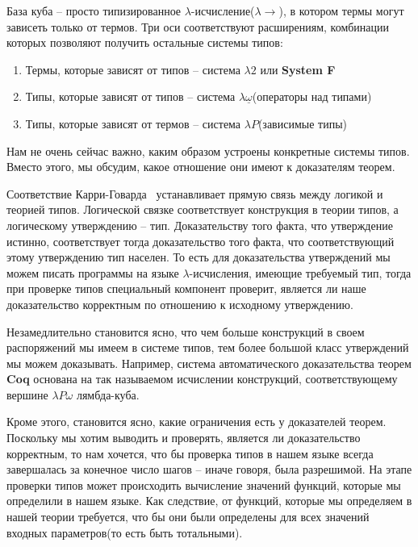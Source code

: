 База куба -- просто типизированное $\lambda$-исчисление($\lambda{\to}$), в котором термы могут зависеть только от термов. Три оси соответствуют расширениям, комбинации которых позволяют получить остальные системы типов:

\begin{enumerate}
  \item Термы, которые зависят от типов -- система $\lambda2$ или \textbf{System F}
  \item Типы, которые зависят от типов -- система $\lambda \underline{\omega}$(операторы над типами)
  \item Типы, которые зависят от термов -- система $\lambda P$(зависимые типы)
\end{enumerate}

Нам не очень сейчас важно, каким образом устроены конкретные системы типов. Вместо этого, мы обсудим, какое отношение они имеют к доказателям теорем.

Соответствие Карри-Говарда~\cite{howard1980formulae} устанавливает прямую связь между логикой и теорией типов. Логической связке соответствует конструкция в теории типов, а логическому утверждению -- тип. Доказательству того факта, что утверждение истинно, соответствует тогда доказательство того факта, что соответствующий этому утверждению тип населен. То есть для доказательства утверждений мы можем писать программы на языке $\lambda$-исчисления, имеющие требуемый тип, тогда при проверке типов специальный компонент проверит, является ли наше доказательство корректным по отношению к исходному утверждению.

Незамедлительно становится ясно, что чем больше конструкций в своем распоряжений мы имеем в системе типов, тем более большой класс утверждений мы можем доказывать. Например, система автоматического доказательства теорем \textbf{Coq} основана на так называемом исчислении конструкций, соответствующему вершине $\lambda{}P{}\omega$ лямбда-куба.

Кроме этого, становится ясно, какие ограничения есть у доказателей теорем. Поскольку мы хотим выводить и проверять, является ли доказательство корректным, то нам хочется, что бы проверка типов в нашем языке всегда завершалась за конечное число шагов -- иначе говоря, была разрешимой. На этапе проверки типов может происходить вычисление значений функций, которые мы определили в нашем языке. Как следствие, от функций, которые мы определяем в нашей теории требуется, что бы они были определены для всех значений входных параметров(то есть быть тотальными).
